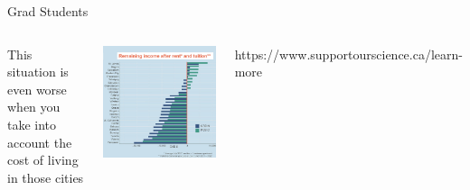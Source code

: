 \documentclass{beamer}
\begin{document}
\begin{frame}{Grad Students}
	\begin{columns}

	This situation is even worse when you take into account the cost of living in those cities

	\includegraphics[width=1\textwidth]{../images/gradmoneyafterrent.jpeg}

	\tiny{https://www.supportourscience.ca/learn-more}
	\end{columns}
\end{frame}
\end{document}
